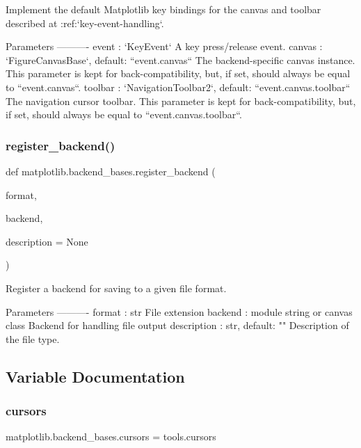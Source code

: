 \begin{DoxyVerb}Implement the default Matplotlib key bindings for the canvas and toolbar
described at :ref:`key-event-handling`.

Parameters
----------
event : `KeyEvent`
    A key press/release event.
canvas : `FigureCanvasBase`, default: ``event.canvas``
    The backend-specific canvas instance.  This parameter is kept for
    back-compatibility, but, if set, should always be equal to
    ``event.canvas``.
toolbar : `NavigationToolbar2`, default: ``event.canvas.toolbar``
    The navigation cursor toolbar.  This parameter is kept for
    back-compatibility, but, if set, should always be equal to
    ``event.canvas.toolbar``.
\end{DoxyVerb}
 \mbox{\label{namespacematplotlib_1_1backend__bases_a4a8cc05719bffc6db22eef463fb832e5}} 
\subsubsection{\texorpdfstring{register\+\_\+backend()}{register\_backend()}}
{\footnotesize\ttfamily def matplotlib.\+backend\+\_\+bases.\+register\+\_\+backend (\begin{DoxyParamCaption}\item[{}]{format,  }\item[{}]{backend,  }\item[{}]{description = {\ttfamily None} }\end{DoxyParamCaption})}

\begin{DoxyVerb}Register a backend for saving to a given file format.

Parameters
----------
format : str
    File extension
backend : module string or canvas class
    Backend for handling file output
description : str, default: ""
    Description of the file type.
\end{DoxyVerb}
 

\subsection{Variable Documentation}
\mbox{\label{namespacematplotlib_1_1backend__bases_adc161ae2cced74cf28308e01920a24c3}} 
\subsubsection{\texorpdfstring{cursors}{cursors}}
{\footnotesize\ttfamily matplotlib.\+backend\+\_\+bases.\+cursors = tools.\+cursors}

